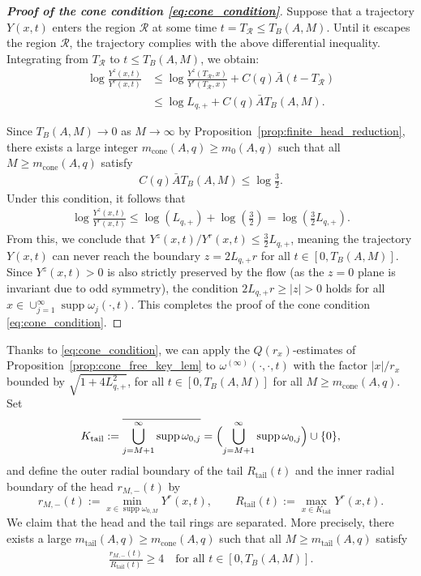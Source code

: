 \documentclass[reqno,11pt]{amsart}
\newcommand{\supp}{\operatorname{supp}}
\begin{document}
\begin{proof}[\textbf{Proof of the cone condition \eqref{eq:cone_condition}}]
Suppose that a trajectory $Y(x,t)$ enters the region $\mathcal{R}$ at some time $t=T_{\mathcal{R}} \le T_B(A,M)$. 
Until it escapes the region $\mathcal{R}$, the trajectory complies with the above differential inequality. 
Integrating from $T_{\mathcal{R}}$ to $t \le T_B(A,M)$, we obtain:
\begin{align*}
    \log \frac{Y^z(x,t)}{Y^r(x,t)} 
    &\le \log \frac{Y^z(T_{\mathcal{R}},x)}{Y^r(T_{\mathcal{R}},x)} + C(q) \bar A (t - T_{\mathcal{R}}) \\
    &\le \log L_{q,+} + C(q) \bar A T_B(A,M).
\end{align*}

Since $T_B(A,M) \to 0$ as $M \to \infty$ by Proposition~\ref{prop:finite_head_reduction}, there exists a large integer $m_{\mathrm{cone}}(A,q)\geq m_0(A,q)$ such that all $M\geq m_{\mathrm{cone}}(A,q)$ satisfy
\begin{align}
\label{eq:def_m_cone}
C(q) \bar A T_B(A,M) \le \log \frac32.
\end{align}
Under this condition, it follows that
\begin{align*}
    \log \frac{Y^z(x,t)}{Y^r(x,t)} \le \log \left(L_{q,+}\right) + \log\left( \frac32 \right) = \log \left( \frac{3}{2}L_{q,+} \right).
\end{align*}
From this, we conclude that $Y^z(x,t) / Y^r(x,t) \le \frac{3}{2}L_{q,+}$, meaning the trajectory $Y(x,t)$ can never reach the boundary $z = 2L_{q,+} r$ for all $t \in [0, T_B(A,M)]$. 
Since $Y^z(x,t) > 0$ is also strictly preserved by the flow (as the $z=0$ plane is invariant due to odd symmetry), the condition $2L_{q,+}r \ge |z| > 0$ holds for all $x \in \cup_{j=1}^\infty \supp \omega_j(\cdot,t)$. This completes the proof of the cone condition \eqref{eq:cone_condition}.
\end{proof}





Thanks to \eqref{eq:cone_condition}, we can apply the $Q(r_x)$-estimates of Proposition~\ref{prop:cone_free_key_lem} to $\omega^{(\infty)}(\cdot,\cdot,t)$ with the factor $|x|/r_x$  bounded by $\sqrt{1+4L_{q,+}^2}$, for all $t\in[0,T_B(A,M)]$ for all  $M\geq m_{\mathrm{cone}}(A,q)$.
Set
\[
K_{\mathrm{tail}}
:=
\overline{\bigcup_{j=M+1}^{\infty}\operatorname{supp}\omega_{0,j}}
=
\Bigl(\bigcup_{j=M+1}^{\infty}\operatorname{supp}\omega_{0,j}\Bigr)\cup \{0\},
\]
and define the outer radial boundary of the tail $R_{\mathrm{tail}}(t)$ and  the inner radial boundary of the head $r_{M,-}(t)$ by
\[
r_{M,-}(t):=
\min_{x\in \operatorname{supp}\omega_{0,M}} Y^r(x,t),
\qquad
R_{\mathrm{tail}}(t):=
\max_{x\in K_{\mathrm{tail}}} Y^r(x,t).
\]
We claim that the head and the tail rings are separated. More precisely, there exists a large $m_{\mathrm{tail}}(A,q)\geq m_{\mathrm{cone}}(A,q)$ such that all $M\geq m_{\mathrm{tail}}(A,q)$ satisfy
    \begin{align}
    \label{eq:tail_head_separation}
        \frac{r_{M,-}(t)}{R_{\mathrm{tail}}(t)} \geq 4 \quad \text{for all }t\in [0,T_B(A,M)].
    \end{align}
\end{document}
